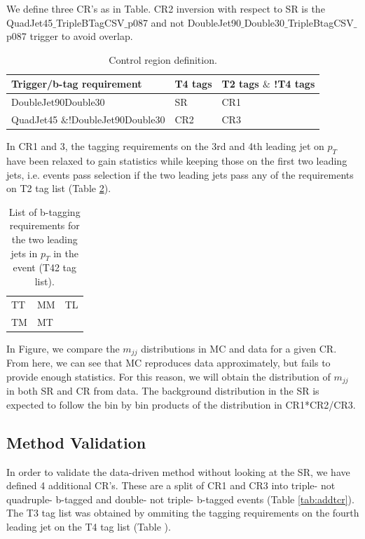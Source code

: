 We define three CR's as in Table. CR2 inversion with respect to SR is the QuadJet45$\_$TripleBTagCSV$\_$p087 and not DoubleJet90$\_$Double30$\_$TripleBtagCSV$\_$p087 trigger to avoid overlap.

\begin{table}[hbtp]\footnotesize
	\centering
	\begin{tabular}{l l l}
		\hline
		\textbf{Trigger/b-tag requirement} & T4 tags & T2 tags $\&$ !T4 tags \\
		\hline
		DoubleJet90Double30 & SR & CR1 \\
		QuadJet45 $\&$!DoubleJet90Double30 & CR2 & CR3 \\
		\hline
	\end{tabular}
	\caption{Control region definition.}
	\label{tab:srcr}
\end{table}

In CR1 and 3, the tagging requirements on the 3rd and 4th leading jet on $p_{T}$ have been relaxed to gain statistics while keeping those on the first two leading jets, i.e. events pass selection if the two leading jets pass any of the requirements on T2 tag list (Table \ref{tab:t2tag}).

\begin{table}[hbtp]\footnotesize
	\centering
	\begin{tabular}{l|l|l}
		\hline
		TT & MM & TL\\
		TM & MT & \\
		\hline
	\end{tabular}
	\caption{List of b-tagging requirements for the two leading jets in $p_{T}$ in the event (T42 tag list).}
	\label{tab:t2tag}
\end{table}

In Figure, we compare the $m_{jj}$ distributions in MC and data for a given CR. From here, we can see that MC reproduces data approximately, but fails to provide enough statistics. For this reason, we will obtain the distribution of $m_{jj}$ in both SR and CR from data. The background distribution in the SR is expected to follow the bin by bin products of the distribution in CR1*CR2/CR3.

\subsection{Method Validation}

In order to validate the data-driven method without looking at the SR, we have defined 4 additional CR's. These are a split of CR1 and CR3 into triple- not quadruple- b-tagged and double- not triple- b-tagged events (Table \ref{tab:addtcr}). The T3 tag list was obtained by ommiting the tagging requirements on the fourth leading jet on the T4 tag list (Table ).

